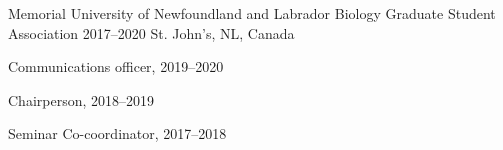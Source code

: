 \begin{cventries}

    

    
  \cventry
    {Memorial University of Newfoundland and Labrador} %
    {Biology Graduate Student Association} %
    {2017--2020} %
    {St. John's, NL, Canada} %
    {
      \begin{cvitems}
          \item Communications officer, 2019--2020
          \item Chairperson, 2018--2019
          \item Seminar Co-coordinator, 2017--2018
      \end{cvitems}
      }

    


\end{cventries}
